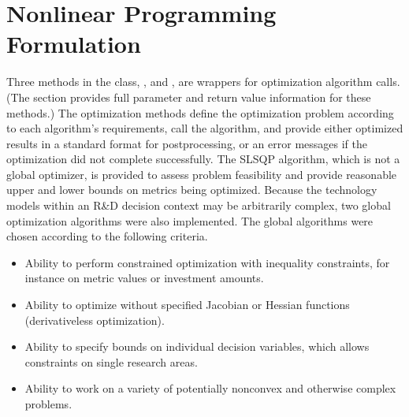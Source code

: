 \documentclass[letterpaper,10pt,english]{sphinxmanual}
\begin{document}
\section{Nonlinear Programming Formulation}
\label{\detokenize{optimizers:nonlinear-programming-formulation}}
\sphinxAtStartPar
Three methods in the  class, ,  and , are
wrappers for optimization algorithm calls. (The {\hyperref[\detokenize{tyche:sec-epsconstraint}]{}} section provides full parameter and return value information for these methods.) The optimization methods define the optimization problem according to each algorithm’s requirements, call the algorithm, and provide either optimized results in a standard format for postprocessing, or an error messages if the optimization did not complete successfully. The SLSQP algorithm, which is not a global optimizer, is provided to assess problem feasibility and provide reasonable upper and lower bounds on metrics being optimized. Because the technology models within an R\&D decision context may be arbitrarily complex, two global optimization algorithms were also implemented. The global algorithms were chosen according to the following criteria.
\begin{itemize}
\item {} 
\sphinxAtStartPar
Ability to perform constrained optimization with inequality constraints, for instance on metric values or investment amounts.

\item {} 
\sphinxAtStartPar
Ability to optimize without specified Jacobian or Hessian functions (derivative\sphinxhyphen{}less optimization).

\item {} 
\sphinxAtStartPar
Ability to specify bounds on individual decision variables, which allows constraints on single research areas.

\item {} 
\sphinxAtStartPar
Ability to work on a variety of potentially non\sphinxhyphen{}convex and otherwise complex problems.

\end{itemize}
\end{document}
